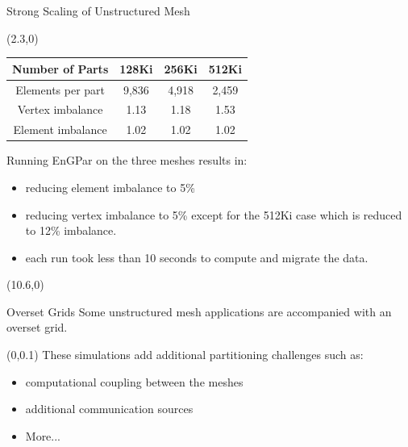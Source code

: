 \documentclass{beamer}
\begin{document}
\begin{textblock}{15.6}
\begin{textblock}{5}
\begin{block}{Strong Scaling of Unstructured Mesh}
\begin{textblock}{2.3}
      \end{textblock}
      \begin{textblock}{2.5}(2.3,0)
      \begin{table}[!h]
        \centering
        \begin{tabular}{||c|c|c|c||}
          \hline
          Number of Parts &128Ki&256Ki&512Ki \\
          \hline
          Elements per part & 9,836 & 4,918&2,459  \\
          \hline
          Vertex imbalance & 1.13 & 1.18 & 1.53 \\
          \hline
          Element imbalance & 1.02& 1.02& 1.02\\
          \hline
        \end{tabular}
      \end{table}
      \end{textblock}
      \vspace{10cm}

      Running EnGPar on the three meshes results in:
      \begin{itemize}
      \item reducing element imbalance to 5\%
      \item reducing vertex imbalance to 5\% except for the 512Ki case which is reduced to 12\% imbalance.
      \item each run took less than 10 seconds to compute and migrate the data.
      \end{itemize}
      
      
    \end{block}
  \end{textblock}
  \begin{textblock}{5}(10.6,0)
    \begin{block}{Overset Grids}
      Some unstructured mesh applications are accompanied with an overset grid.
      \begin{textblock}{2.7}(0,0.1)
        These simulations add additional partitioning challenges such as:
        \begin{itemize}
        \item computational coupling between the meshes
        \item additional communication sources
        \item More...
        \end{itemize}


\end{textblock}
\end{block}
\end{textblock}
\end{textblock}
\end{document}
